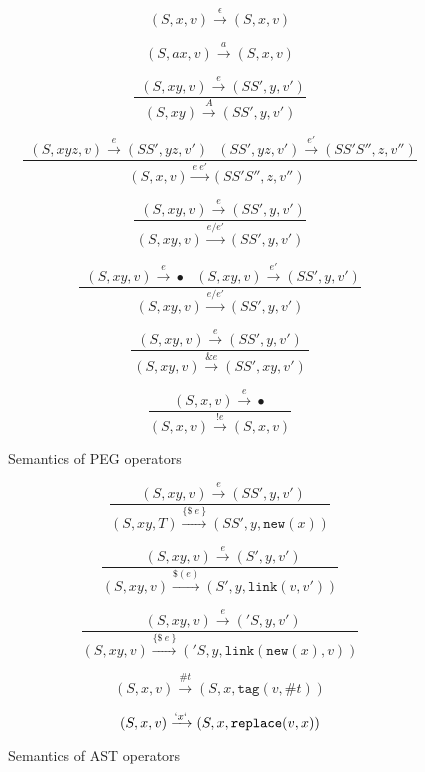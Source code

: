 \documentclass[preprint]{sigplanconf}
\begin{document}
\begin{figure}[tb]
\begin{small}
\fbox{$\epsilon$} \vspace{-3mm}
\[
{(S, x, v) \xrightarrow{\epsilon} (S, x, v)}
\]

 \vspace{-3mm}
\[
{(S, ax, v) \xrightarrow{a} (S, x, v)}
\]

 \vspace{-3mm}
\[
\frac{~~ (S, xy, v) \xrightarrow{e} (SS', y, v')}
{(S, xy) \xrightarrow{A} (SS', y, v')}
\]

 \[
\frac{~~ (S, xyz, v) \xrightarrow{e} (SS', yz, v') ~~~ (SS', yz, v') \xrightarrow{e'} (SS'S'', z, v'')}
{(S, x, v) \xrightarrow{e ~e'} (SS'S'', z, v'') ~~}
\]

 \vspace{-3mm}
\[
\frac{~~ (S, xy, v) \xrightarrow{e} (SS', y, v') }{(S, xy, v) \xrightarrow{e/e'} (SS', y, v')}
\]

\[
\frac{~~ (S, xy, v) \xrightarrow{e} \bullet ~~~ (S, xy, v) \xrightarrow{e'} (SS', y, v') }{(S, xy, v) \xrightarrow{e/e'} (SS', y, v')}
\]

 \vspace{-3mm}
\[
\frac{~~ (S, xy, v) \xrightarrow{e} (SS', y, v')~~ }{(S, xy, v) \xrightarrow{\&e} (SS', xy, v')}
\]

 \vspace{-3mm}
\[
\frac{~~ (S, x, v) \xrightarrow{e} \bullet ~~}{(S, x, v) \xrightarrow{!e} (S, x, v)}
\]
\end{small}
\caption{Semantics of PEG operators}
\label{fig:sempeg}
\end{figure}


\begin{figure}[tbh]
\begin{small}
 \vspace{-3mm}
\[
\frac{~~ (S, xy, v) \xrightarrow{e} (SS', y, v')}
{(S, xy, T) \xrightarrow{\{\$~e~\}} (SS', y, \texttt{new}(x))}
\]

 \vspace{-3mm}
\[
\frac{~~ (S, xy, v) \xrightarrow{e} (S', y, v')}
{(S, xy, v) \xrightarrow{\$(e)} (S', y, \texttt{link}(v, v'))}
\]

 \vspace{-3mm}
\[
\frac{~~ (S, xy, v) \xrightarrow{e} ('S, y, v')}
{(S, xy, v) \xrightarrow{\{\$~e~\}} ('S, y, \texttt{link}(\texttt{new}(x),v)  )}
\]

 \vspace{-3mm}
\[
      (S, x, v)  \xrightarrow{\#t} (S, x, \texttt{tag}(v, \#t))
\]

 \vspace{-3mm}
\[
      (S, x, v)  \xrightarrow{`x`} (S, x, \texttt{replace}(v, x))
\]

\end{small}

\caption{Semantics of AST operators}
\label{fig:semast}
\end{figure}
\end{document}
